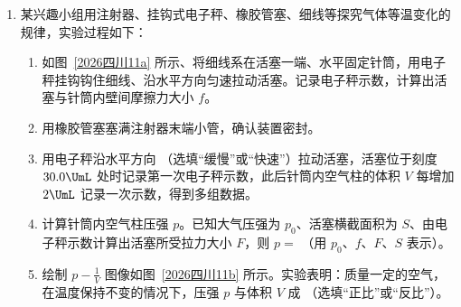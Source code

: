 \documentclass[\gkver]{gaokaozhenti}
\begin{document}
\begin{enumerate}
{当 $N = \frac{3}{5}mg$ 时，解得平衡临界 $h \approx 0.28R < \frac{\sqrt{3}}{4}R$，故 C 错误；

D．根据 $N = \frac{mg}{2(\cos\theta + \frac{\sqrt{3}}{3}\sin\theta)}$

结合辅助角公式可得

$N = \frac{mg}{\frac{4\sqrt{3}}{3}\sin\left(\theta + 60{^\circ}\right)}$

可得 $N$ 的最小值 $N = \frac{\sqrt{3}}{4}mg$，故 D 正确。

故选 AD。
}
\item
某兴趣小组用注射器、挂钩式电子秤、橡胶管塞、细线等探究气体等温变化的规律，实验过程如下：

\begin{enumerate}
\item
如图~\ref{2026四川11a} 所示、将细线系在活塞一端、水平固定针筒，用电子秤挂钩钩住细线、沿水平方向匀速拉动活塞。记录电子秤示数，计算出活塞与针筒内壁间摩擦力大小 $f$。
\item
用橡胶管塞塞满注射器末端小管，确认装置密封。
\item
用电子秤沿水平方向 （选填“缓慢”或“快速”）拉动活塞，活塞位于刻度 $30.0 \UmL$ 处时记录第一次电子秤示数，此后针筒内空气柱的体积 $V$ 每增加 $2 \UmL$ 记录一次示数，得到多组数据。
\item
计算针筒内空气柱压强 $p$。已知大气压强为 $p_{0}$、活塞横截面积为 $S$、由电子秤示数计算出活塞所受拉力大小 $F$，则 $p = $ （用 $p_{0}$、$f$、$F$、$S$ 表示）。
\item
绘制 $p-\frac{1}{V}$ 图像如图~\ref{2026四川11b} 所示。实验表明：质量一定的空气，在温度保持不变的情况下，压强 $p$ 与体积 $V$ 成 （选填“正比”或“反比”）。
\end{enumerate}


\end{enumerate}
\end{document}
